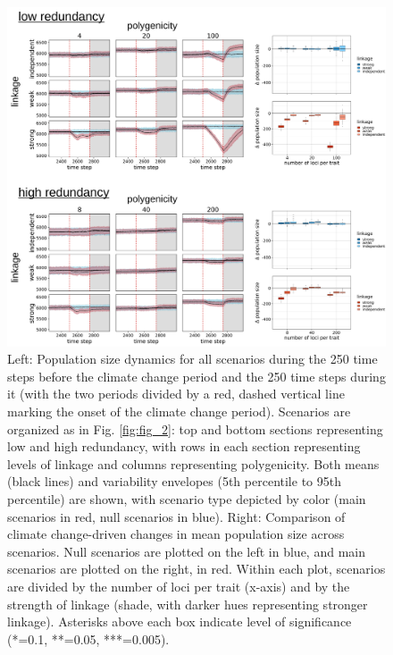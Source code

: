 \documentclass[9pt,twocolumn,twoside,lineno]{pnas-new}
\begin{document}
\begin{figure}[\sidecaptionrelwidth][t]
\centering
\includegraphics[width=17.8cm]{pub/figs/FIG_S2_Nt_over_time.jpg}
\caption{Left: Population size dynamics for all scenarios during the 250 time steps before the climate change period and the 250 time steps during it (with the two periods divided by a red, dashed vertical line marking the onset of the climate change period). Scenarios are organized as in Fig. \ref{fig:fig_2}: top and bottom sections representing low and high redundancy, with rows in each section representing levels of linkage and columns representing polygenicity. Both means (black lines) and variability envelopes (5th percentile to 95th percentile) are shown, with scenario type depicted by color (main scenarios in red, null scenarios in blue). Right: Comparison of climate change-driven changes in mean population size across scenarios. Null scenarios are plotted on the left in blue, and main scenarios are plotted on the right, in red. Within each plot, scenarios are divided by the number of loci per trait (x-axis) and by the strength of linkage (shade, with darker hues representing stronger linkage). Asterisks above each box indicate level of significance (*=0.1, **=0.05, ***=0.005).}
\label{fig:fig_s2}
\end{figure}
\end{document}
